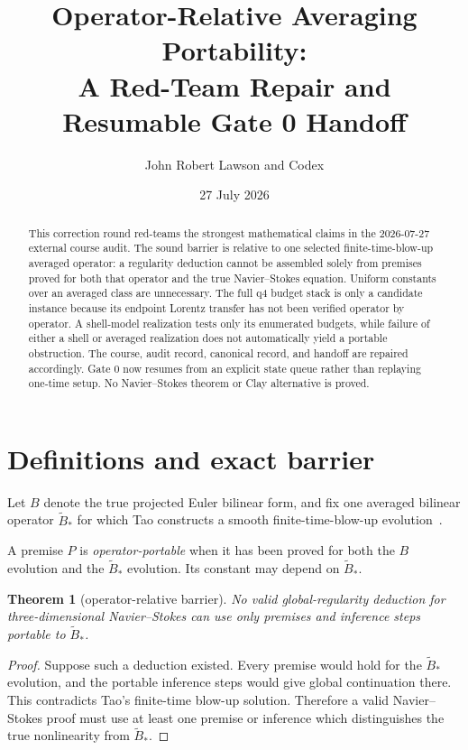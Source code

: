 \documentclass[11pt]{article}
\title{Operator-Relative Averaging Portability:\\
A Red-Team Repair and Resumable Gate 0 Handoff}
\author{John Robert Lawson and Codex}
\date{27 July 2026}
\newtheorem{theorem}{Theorem}
\theoremstyle{remark}
\begin{document}
\maketitle

\begin{abstract}
This correction round red-teams the strongest mathematical claims in
the 2026-07-27 external course audit.  The sound barrier is relative to
one selected finite-time-blow-up averaged operator: a regularity
deduction cannot be assembled solely from premises proved for both that
operator and the true Navier--Stokes equation.  Uniform constants over
an averaged class are unnecessary.  The full q4 budget stack is only a
candidate instance because its endpoint Lorentz transfer has not been
verified operator by operator.  A shell-model realization tests only
its enumerated budgets, while failure of either a shell or averaged
realization does not automatically yield a portable obstruction.  The
course, audit record, canonical record, and handoff are repaired
accordingly.  Gate 0 now resumes from an explicit state queue rather
than replaying one-time setup.  No Navier--Stokes theorem or Clay
alternative is proved.
\end{abstract}

\section{Definitions and exact barrier}

Let \(B\) denote the true projected Euler bilinear form, and fix one
averaged bilinear operator \(\widetilde B_*\) for which Tao constructs
a smooth finite-time-blow-up evolution~\cite{Tao16}.

A premise \(P\) is \emph{operator-portable} when it has been proved for
both the \(B\) evolution and the \(\widetilde B_*\) evolution.  Its
constant may depend on \(\widetilde B_*\).

\begin{theorem}[operator-relative barrier]
\label{thm:barrier}
No valid global-regularity deduction for three-dimensional
Navier--Stokes can use only premises and inference steps portable to
\(\widetilde B_*\).
\end{theorem}

\begin{proof}
Suppose such a deduction existed.  Every premise would hold for the
\(\widetilde B_*\) evolution, and the portable inference steps would
give global continuation there.  This contradicts Tao's finite-time
blow-up solution.  Therefore a valid Navier--Stokes proof must use at
least one premise or inference which distinguishes the true
nonlinearity from \(\widetilde B_*\).
\end{proof}
\end{document}
